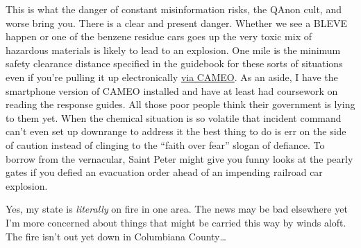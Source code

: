 This is what the danger of constant misinformation risks, the QAnon
cult, and worse bring you. There is a clear and present danger. Whether
we see a BLEVE happen or one of the benzene residue cars goes up the
very toxic mix of hazardous materials is likely to lead to an explosion.
One mile is the minimum safety clearance distance specified in the
guidebook for these sorts of situations even if you're pulling it up
electronically \href{https://cameochemicals.noaa.gov/}{via CAMEO}. As an
aside, I have the smartphone version of CAMEO installed and have at
least had coursework on reading the response guides. All those poor
people think their government is lying to them yet. When the chemical
situation is so volatile that incident command can't even set up
downrange to address it the best thing to do is err on the side of
caution instead of clinging to the ``faith over fear'' slogan of
defiance. To borrow from the vernacular, Saint Peter might give you
funny looks at the pearly gates if you defied an evacuation order ahead
of an impending railroad car explosion.

Yes, my state is \emph{literally} on fire in one area. The news may be
bad elsewhere yet I'm more concerned about things that might be carried
this way by winds aloft. The fire isn't out yet down in Columbiana
County\ldots{}
